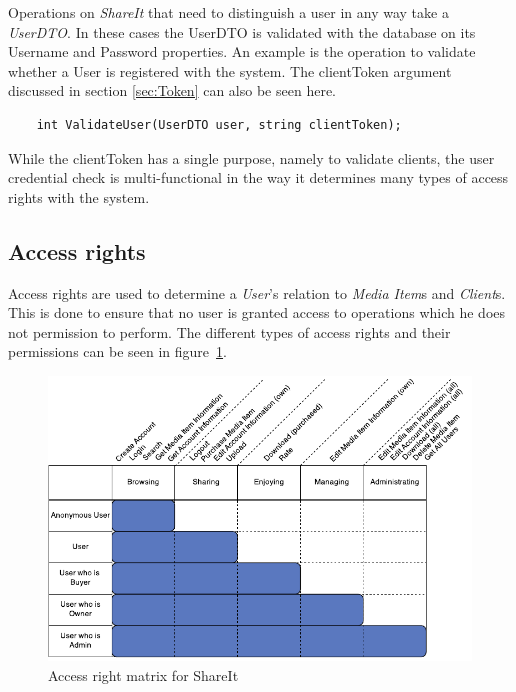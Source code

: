 \documentclass[../report.tex]{subfiles}
\begin{document}
Operations on \textit{ShareIt} that need to distinguish a user in any way take a \textit{UserDTO}. In these cases the UserDTO is validated with the database on its Username and Password properties. An example is the operation to validate whether a User is registered with the system. The clientToken argument discussed in section \ref{sec:Token} can also be seen here. 

\begin{center}
\begin{lstlisting}
	int ValidateUser(UserDTO user, string clientToken);
\end{lstlisting}
\end{center}


While the clientToken has a single purpose, namely to validate clients, the user credential check is multi-functional in the way it determines many types of access rights with the system.


\subsection{Access rights}


Access rights are used to determine a \textit{User}'s relation to \textit{Media Item}s and \textit{Client}s. This is done to ensure that no user is granted access to operations which he does not permission to perform. The different types of access rights and their permissions can be seen in figure~\ref{fig:accessrightmatrix}. 

\begin{figure}[H]
\centering \includegraphics{AccessRightMatrix.pdf}
\caption{Access right matrix for ShareIt}
\label{fig:accessrightmatrix}
\end{figure}
\end{document}
